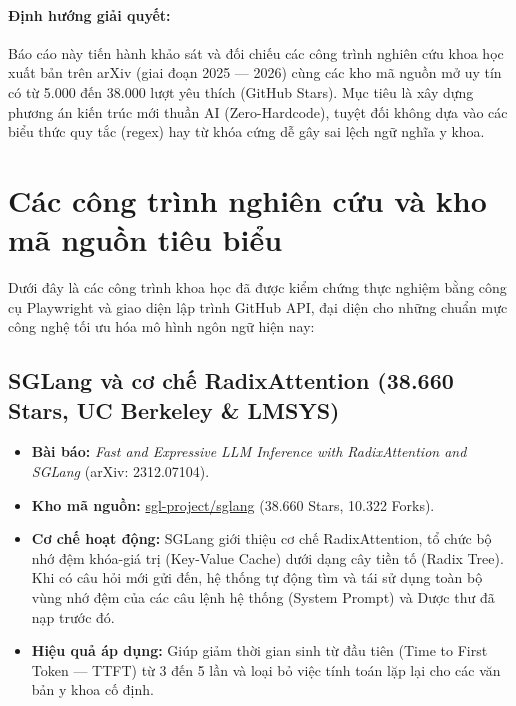 \documentclass[12pt,a4paper]{article}
\begin{document}
\paragraph{Định hướng giải quyết:} Báo cáo này tiến hành khảo sát và đối chiếu các công trình nghiên cứu khoa học xuất bản trên arXiv (giai đoạn 2025 --- 2026) cùng các kho mã nguồn mở uy tín có từ 5.000 đến 38.000 lượt yêu thích (GitHub Stars). Mục tiêu là xây dựng phương án kiến trúc mới thuần AI (Zero-Hardcode), tuyệt đối không dựa vào các biểu thức quy tắc (regex) hay từ khóa cứng dễ gây sai lệch ngữ nghĩa y khoa.

\section{Các công trình nghiên cứu và kho mã nguồn tiêu biểu}

Dưới đây là các công trình khoa học đã được kiểm chứng thực nghiệm bằng công cụ Playwright và giao diện lập trình GitHub API, đại diện cho những chuẩn mực công nghệ tối ưu hóa mô hình ngôn ngữ hiện nay:

\subsection{SGLang và cơ chế RadixAttention (38.660 Stars, UC Berkeley \& LMSYS)}
\begin{itemize}[leftmargin=1.5em]
    \item \textbf{Bài báo:} \textit{Fast and Expressive LLM Inference with RadixAttention and SGLang} (arXiv: 2312.07104).
    \item \textbf{Kho mã nguồn:} \href{https://github.com/sgl-project/sglang}{sgl-project/sglang} (38.660 Stars, 10.322 Forks).
    \item \textbf{Cơ chế hoạt động:} SGLang giới thiệu cơ chế RadixAttention, tổ chức bộ nhớ đệm khóa-giá trị (Key-Value Cache) dưới dạng cây tiền tố (Radix Tree). Khi có câu hỏi mới gửi đến, hệ thống tự động tìm và tái sử dụng toàn bộ vùng nhớ đệm của các câu lệnh hệ thống (System Prompt) và Dược thư đã nạp trước đó.
    \item \textbf{Hiệu quả áp dụng:} Giúp giảm thời gian sinh từ đầu tiên (Time to First Token --- TTFT) từ 3 đến 5 lần và loại bỏ việc tính toán lặp lại cho các văn bản y khoa cố định.
\end{itemize}
\end{document}
